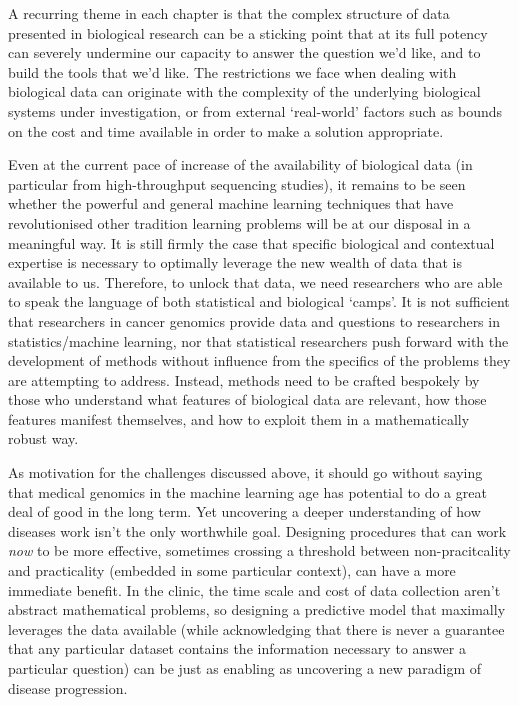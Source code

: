 \documentclass[thesis.tex]{subfiles}
\begin{document}
A recurring theme in each chapter is that the complex structure of data presented in biological research can be a sticking point that at its full potency can severely undermine our capacity to answer the question we'd like, and to build the tools that we'd like. The restrictions we face when dealing with biological data can originate with the complexity of the underlying biological systems under investigation, or from external `real-world' factors such as bounds on the cost and time available in order to make a solution appropriate.

Even at the current pace of increase of the availability of biological data (in particular from high-throughput sequencing studies), it remains to be seen whether the powerful and general machine learning techniques that have revolutionised other tradition learning problems will be at our disposal in a meaningful way. It is still firmly the case that specific biological and contextual expertise is necessary to optimally leverage the new wealth of data that is available to us. Therefore, to unlock that data, we need researchers who are able to speak the language of both statistical and biological `camps'. It is not sufficient that researchers in cancer genomics provide data and questions to researchers in statistics/machine learning, nor that statistical researchers push forward with the development of methods without influence from the specifics of the problems they are attempting to address. Instead, methods need to be crafted bespokely by those who understand what features of biological data are relevant, how those features manifest themselves, and how to exploit them in a mathematically robust way. 

As motivation for the challenges discussed above, it should go without saying that medical genomics in the machine learning age has potential to do a great deal of good in the long term. Yet uncovering a deeper understanding of how diseases work isn't the only worthwhile goal. Designing procedures that can work \textit{now} to be more effective, sometimes crossing a threshold between non-pracitcality and practicality (embedded in some particular context), can have a more immediate benefit. In the clinic, the time scale and cost of data collection aren't abstract mathematical problems, so designing a predictive model that maximally leverages the data available (while acknowledging that there is never a guarantee that any particular dataset contains the information necessary to answer a particular question) can be just as enabling as uncovering a new paradigm of disease progression. 
\end{document}
